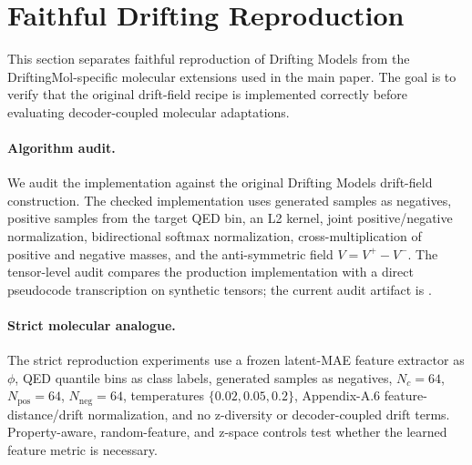 
\section{Faithful Drifting Reproduction}
\label{sec:supp-faithful-drifting}

This section separates faithful reproduction of Drifting Models from the
DriftingMol-specific molecular extensions used in the main paper. The goal is
to verify that the original drift-field recipe is implemented correctly before
evaluating decoder-coupled molecular adaptations.

\paragraph{Algorithm audit.}
We audit the implementation against the original Drifting Models drift-field
construction. The checked implementation uses generated samples as negatives,
positive samples from the target QED bin, an L2 kernel, joint positive/negative
normalization, bidirectional softmax normalization, cross-multiplication of
positive and negative masses, and the anti-symmetric field $V = V^+ - V^-$.
The tensor-level audit compares the production implementation with a direct
pseudocode transcription on synthetic tensors; the current audit artifact is
.

\paragraph{Strict molecular analogue.}
The strict reproduction experiments use a frozen latent-MAE feature extractor
as $\phi$, QED quantile bins as class labels, generated samples as negatives,
$N_c=64$, $N_{\mathrm{pos}}=64$, $N_{\mathrm{neg}}=64$, temperatures
$\{0.02,0.05,0.2\}$, Appendix-A.6 feature-distance/drift normalization, and
no z-diversity or decoder-coupled drift terms. Property-aware, random-feature,
and z-space controls test whether the learned feature metric is necessary.

